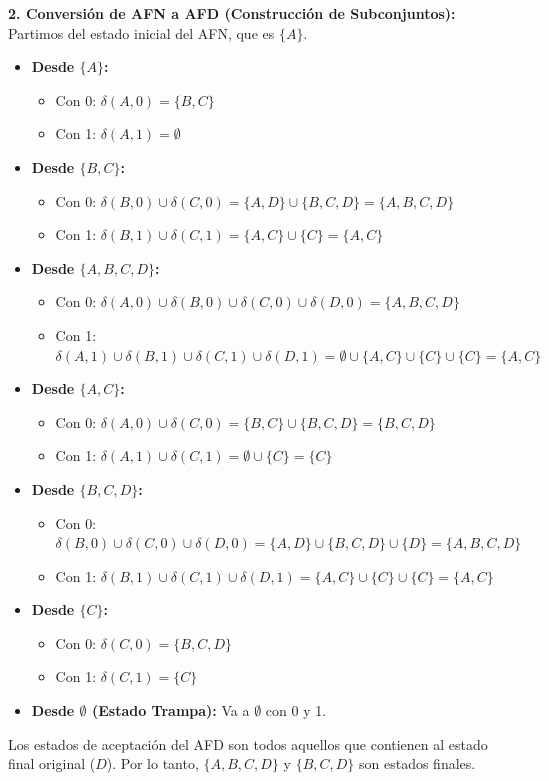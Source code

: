 \documentclass[12pt]{article}
\begin{document}
\textbf{2. Conversión de AFN a AFD (Construcción de Subconjuntos):} \\
Partimos del estado inicial del AFN, que es $\{A\}$.
\begin{itemize}
    \item \textbf{Desde $\{A\}$:} 
    \begin{itemize}
        \item Con 0: $\delta(A, 0) = \{B, C\}$
        \item Con 1: $\delta(A, 1) = \emptyset$
    \end{itemize}
    \item \textbf{Desde $\{B, C\}$:}
    \begin{itemize}
        \item Con 0: $\delta(B, 0) \cup \delta(C, 0) = \{A, D\} \cup \{B, C, D\} = \{A, B, C, D\}$
        \item Con 1: $\delta(B, 1) \cup \delta(C, 1) = \{A, C\} \cup \{C\} = \{A, C\}$
    \end{itemize}
    \item \textbf{Desde $\{A, B, C, D\}$:}
    \begin{itemize}
        \item Con 0: $\delta(A,0) \cup \delta(B,0) \cup \delta(C,0) \cup \delta(D,0) = \{A, B, C, D\}$
        \item Con 1: $\delta(A,1) \cup \delta(B,1) \cup \delta(C,1) \cup \delta(D,1) = \emptyset \cup \{A, C\} \cup \{C\} \cup \{C\} = \{A, C\}$
    \end{itemize}
    \item \textbf{Desde $\{A, C\}$:}
    \begin{itemize}
        \item Con 0: $\delta(A, 0) \cup \delta(C, 0) = \{B, C\} \cup \{B, C, D\} = \{B, C, D\}$
        \item Con 1: $\delta(A, 1) \cup \delta(C, 1) = \emptyset \cup \{C\} = \{C\}$
    \end{itemize}
    \item \textbf{Desde $\{B, C, D\}$:}
    \begin{itemize}
        \item Con 0: $\delta(B, 0) \cup \delta(C, 0) \cup \delta(D, 0) = \{A, D\} \cup \{B, C, D\} \cup \{D\} = \{A, B, C, D\}$
        \item Con 1: $\delta(B, 1) \cup \delta(C, 1) \cup \delta(D, 1) = \{A, C\} \cup \{C\} \cup \{C\} = \{A, C\}$
    \end{itemize}
    \item \textbf{Desde $\{C\}$:}
    \begin{itemize}
        \item Con 0: $\delta(C, 0) = \{B, C, D\}$
        \item Con 1: $\delta(C, 1) = \{C\}$
    \end{itemize}
    \item \textbf{Desde $\emptyset$ (Estado Trampa):} Va a $\emptyset$ con 0 y 1.
\end{itemize}
Los estados de aceptación del AFD son todos aquellos que contienen al estado final original ($D$). Por lo tanto, $\{A, B, C, D\}$ y $\{B, C, D\}$ son estados finales.
\end{document}
